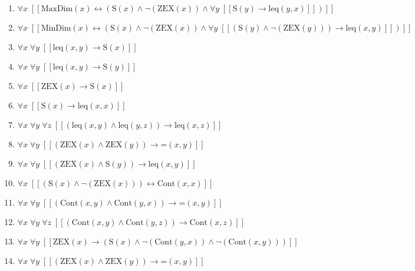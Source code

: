 \documentclass{article}
\begin{document}
\begin{enumerate}
\item $\forall x\;  \left[ \left[ \textrm{MaxDim}(x) \leftrightarrow \left(\textrm{S}(x) \land \neg \left(\textrm{ZEX}(x)\right) \land \forall y\;  \left[ \left[ \textrm{S}(y) \rightarrow \textrm{leq}(y,x) \right] \right]\right) \right] \right]$
\item $\forall x\;  \left[ \left[ \textrm{MinDim}(x) \leftrightarrow \left(\textrm{S}(x) \land \neg \left(\textrm{ZEX}(x)\right) \land \forall y\;  \left[ \left[ \left(\textrm{S}(y) \land \neg \left(\textrm{ZEX}(y)\right)\right) \rightarrow \textrm{leq}(x,y) \right] \right]\right) \right] \right]$
\item $\forall x\; \forall y\;  \left[ \left[ \textrm{leq}(x,y) \rightarrow \textrm{S}(x) \right] \right]$
\item $\forall x\; \forall y\;  \left[ \left[ \textrm{leq}(x,y) \rightarrow \textrm{S}(y) \right] \right]$
\item $\forall x\;  \left[ \left[ \textrm{ZEX}(x) \rightarrow \textrm{S}(x) \right] \right]$
\item $\forall x\;  \left[ \left[ \textrm{S}(x) \rightarrow \textrm{leq}(x,x) \right] \right]$
\item $\forall x\; \forall y\; \forall z\;  \left[ \left[ \left(\textrm{leq}(x,y) \land \textrm{leq}(y,z)\right) \rightarrow \textrm{leq}(x,z) \right] \right]$
\item $\forall x\; \forall y\;  \left[ \left[ \left(\textrm{ZEX}(x) \land \textrm{ZEX}(y)\right) \rightarrow \textrm{=}(x,y) \right] \right]$
\item $\forall x\; \forall y\;  \left[ \left[ \left(\textrm{ZEX}(x) \land \textrm{S}(y)\right) \rightarrow \textrm{leq}(x,y) \right] \right]$
\item $\forall x\;  \left[ \left[ \left(\textrm{S}(x) \land \neg \left(\textrm{ZEX}(x)\right)\right) \leftrightarrow \textrm{Cont}(x,x) \right] \right]$
\item $\forall x\; \forall y\;  \left[ \left[ \left(\textrm{Cont}(x,y) \land \textrm{Cont}(y,x)\right) \rightarrow \textrm{=}(x,y) \right] \right]$
\item $\forall x\; \forall y\; \forall z\;  \left[ \left[ \left(\textrm{Cont}(x,y) \land \textrm{Cont}(y,z)\right) \rightarrow \textrm{Cont}(x,z) \right] \right]$
\item $\forall x\; \forall y\;  \left[ \left[ \textrm{ZEX}(x) \rightarrow \left(\textrm{S}(x) \land \neg \left(\textrm{Cont}(y,x)\right) \land \neg \left(\textrm{Cont}(x,y)\right)\right) \right] \right]$
\item $\forall x\; \forall y\;  \left[ \left[ \left(\textrm{ZEX}(x) \land \textrm{ZEX}(y)\right) \rightarrow \textrm{=}(x,y) \right] \right]$

\end{enumerate}
\end{document}
